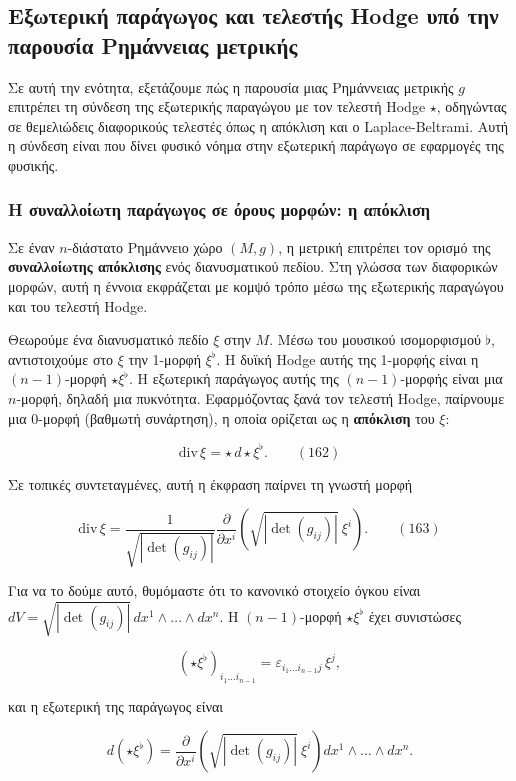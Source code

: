 \documentclass[12pt]{article}
\begin{document}
\subsection{Εξωτερική παράγωγος και τελεστής Hodge υπό την παρουσία Ρημάννειας μετρικής}

Σε αυτή την ενότητα, εξετάζουμε πώς η παρουσία μιας Ρημάννειας μετρικής $g$ επιτρέπει τη σύνδεση της εξωτερικής παραγώγου με τον τελεστή Hodge $\star$, οδηγώντας σε θεμελιώδεις διαφορικούς τελεστές όπως η απόκλιση και ο Laplace-Beltrami. Αυτή η σύνδεση είναι που δίνει φυσικό νόημα στην εξωτερική παράγωγο σε εφαρμογές της φυσικής.

\subsubsection{Η συναλλοίωτη παράγωγος σε όρους μορφών: η απόκλιση}

Σε έναν $n$-διάστατο Ρημάννειο χώρο $(M, g)$, η μετρική επιτρέπει τον ορισμό της \textbf{συναλλοίωτης απόκλισης} ενός διανυσματικού πεδίου. Στη γλώσσα των διαφορικών μορφών, αυτή η έννοια εκφράζεται με κομψό τρόπο μέσω της εξωτερικής παραγώγου και του τελεστή Hodge.

Θεωρούμε ένα διανυσματικό πεδίο $\xi$ στην $M$. Μέσω του μουσικού ισομορφισμού $\flat$, αντιστοιχούμε στο $\xi$ την 1-μορφή $\xi^\flat$. Η δυϊκή Hodge αυτής της 1-μορφής είναι η $(n-1)$-μορφή $\star \xi^\flat$. Η εξωτερική παράγωγος αυτής της $(n-1)$-μορφής είναι μια $n$-μορφή, δηλαδή μια πυκνότητα. Εφαρμόζοντας ξανά τον τελεστή Hodge, παίρνουμε μια 0-μορφή (βαθμωτή συνάρτηση), η οποία ορίζεται ως η \textbf{απόκλιση} του $\xi$:

\[
\text{div} \, \xi = \star \, d \star \xi^\flat. \qquad (162)
\]

Σε τοπικές συντεταγμένες, αυτή η έκφραση παίρνει τη γνωστή μορφή

\[
\text{div} \, \xi = \frac{1}{\sqrt{|\det(g_{ij})|}} \frac{\partial}{\partial x^i} \left( \sqrt{|\det(g_{ij})|} \ \xi^i \right). \qquad (163)
\]

Για να το δούμε αυτό, θυμόμαστε ότι το κανονικό στοιχείο όγκου είναι $dV = \sqrt{|\det(g_{ij})|} \, dx^1 \wedge \dots \wedge dx^n$. Η $(n-1)$-μορφή $\star \xi^\flat$ έχει συνιστώσες

\[
(\star \xi^\flat)_{i_1 \dots i_{n-1}} = \varepsilon_{i_1 \dots i_{n-1} j} \, \xi^j,
\]

και η εξωτερική της παράγωγος είναι

\[
d(\star \xi^\flat) = \frac{\partial}{\partial x^i} \left( \sqrt{|\det(g_{ij})|} \ \xi^i \right) dx^1 \wedge \dots \wedge dx^n.
\]
\end{document}
